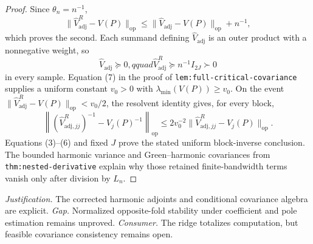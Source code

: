 \documentclass{article}
\begin{document}
\begin{proof}
Since \(\theta_n=n^{-1}\),
\[
 \|\widehat V_{\mathrm{adj}}^R-V(P)\|_{\mathrm{op}}
 \leq\|\widehat V_{\mathrm{adj}}-V(P)\|_{\mathrm{op}}+n^{-1},        \tag{4}
\]
which proves the second.  Each summand defining \(\widehat V_{\mathrm{adj}}\) is an outer product with a nonnegative weight, so
\[
 \widehat V_{\mathrm{adj}}\succeq0,qquad
 \widehat V_{\mathrm{adj}}^R\succeq n^{-1}I_{2J}\succ0               \tag{5}
\]
in every sample.  Equation (7) in the proof of \texttt{lem:full-critical-covariance} supplies a uniform constant \(v_0>0\) with \(\lambda_{\min}(V(P))\geq v_0\).  On the event
\(\|\widehat V_{\mathrm{adj}}^R-V(P)\|_{\mathrm{op}}<v_0/2\), the resolvent identity gives, for every block,
\[
 \left\|(\widehat V_{\mathrm{adj},jj}^R)^{-1}-V_j(P)^{-1}\right\|_{\mathrm{op}}
 \leq 2v_0^{-2}
 \|\widehat V_{\mathrm{adj},jj}^R-V_j(P)\|_{\mathrm{op}}.             \tag{6}
\]
Equations (3)--(6) and fixed \(J\) prove the stated uniform block-inverse conclusion.  The bounded harmonic variance and Green--harmonic covariances from \texttt{thm:nested-derivative} explain why those retained finite-bandwidth terms vanish only after division by \(L_n\).
\end{proof}
\par\smallskip\noindent \textit{Justification.} The corrected harmonic adjoints and conditional covariance algebra are explicit. \textit{Gap.} Normalized opposite-fold stability under coefficient and pole estimation remains unproved. \textit{Consumer.} The ridge totalizes computation, but feasible covariance consistency remains open.
\end{document}
